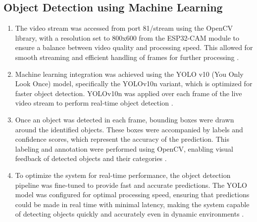 \documentclass[12pt,a4paper]{report}
\begin{document}
\label{Object Detection using Machine Learning}
\subsection{Object Detection using Machine Learning}
\begin{enumerate}
\item The video stream was accessed from port 81/stream using the OpenCV library, with a resolution set to 800x600 from the ESP32-CAM module to ensure a balance between video quality and processing speed. This allowed for smooth streaming and efficient handling of frames for further processing \cite{esp32cam}.
\item Machine learning integration was achieved using the YOLO v10 (You Only Look Once) model, specifically the YOLOv10n variant, which is optimized for faster object detection. YOLOv10n was applied over each frame of the live video stream to perform real-time object detection \cite{yolov10}.
\item Once an object was detected in each frame, bounding boxes were drawn around the identified objects. These boxes were accompanied by labels and confidence scores, which represent the accuracy of the prediction. This labeling and annotation were performed using OpenCV, enabling visual feedback of detected objects and their categories \cite{homl}.
\item To optimize the system for real-time performance, the object detection pipeline was fine-tuned to provide fast and accurate predictions. The YOLO model was configured for optimal processing speed, ensuring that predictions could be made in real time with minimal latency, making the system capable of detecting objects quickly and accurately even in dynamic environments \cite{robotsearch}.


\end{enumerate}
\end{document}
